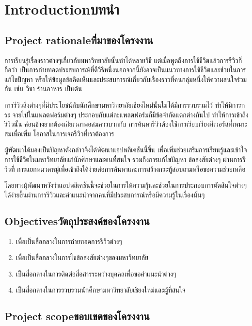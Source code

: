 \chapter{\ifenglish Introduction\else บทนำ\fi}

\section{\ifenglish Project rationale\else ที่มาของโครงงาน\fi}

การเรียนรู้เรื่องราวต่างๆเกี่ยวกับมหาวิทยาลัยนั้นทําได้หลายวิธี แต่เมื่อพูดถึงการใช้ชีวิตแล้วการรีวิวก็ถือว่า
เป็นการถ่ายทอดประสบการณ์ที่ดีวิธีหนึ่งนอกจากนี้ยังอาจเป็นแนวทางการใช้ชีวิตและช่วยในการแก้ไขปัญหา
หรือให้ข้อมูลข้อคิดเห็นและประสบการณ์เกี่ยวกับเรื่องราวที่คนกลุ่มหนึ่งให้ความสนใจร่วมกัน เช่น วิชา ร้านอาหาร เป็นต้น

การรีวิวสิ่งต่างๆที่มีประโยชน์กับนักศึกษามหาวิทยาลัยเชียงใหม่นั้นไม่ได้มีการรวบรวมไว้ ทําให้มีการกระ
จายไปในแพลตฟอร์มต่างๆ ประกอบกับแต่ละแพลตฟอร์มก็มีข้อจํากัดแตกต่างกันไป ทําให้การเข้าถึงรีวิวนั้น
ค่อนข้างยากต้องเสียเวลาพอสมควรบวกกับ การค้นหารีวิวต้องใช้การเรียบเรียงคีเวอร์สที่เหมาะสมเพื่อเพิ่ม
โอกาสในการเจอรีวิวที่เราต้องการ


ผู้พัฒนาได้มองเป็นปัญหาดังกล่าวจึงได้พัฒนาแอปพลิเคชันนี้ขึ้น เพื่อเพิ่มช่วยเสริมการเรียนรู้และเข้าใจ
การใช้ชีวิตในมหาวิทยาลัยแก่นักศึกษาและคนที่สนใจ รวมถึงการแก้ไขปัญหา ข้อสงสัยต่างๆ ผ่านการรีวิวที่ี
การแยกหมวดหมู่เพื่อเข้าถึงได้ง่ายต่อการค้นหาและการสร้างกระทู้สอบถามหรือขอความช่วยเหลือ

โดยทางผู้พัฒนาหวังว่าแอปพลิเคชันนี้จะช่วยในการให้ความรู้และช่วยในการประกอบการตัดสินใจต่างๆ
ได้ง่ายขึ้นผ่านการรีวิวและคําแนะนําจากคนที่มีประสบการณ์หรือมีความรู้ในเรื่องนั้นๆ

\section{\ifenglish Objectives\else วัตถุประสงค์ของโครงงาน\fi}
\begin{enumerate}
    \item เพื่อเป็นสื่อกลางในการถ่ายทอดการรีวิวต่างๆ
    \item เพื่อเป็นสื่อกลางในการไขข้อสงสัยต่างๆของมหาวิทยาลัย
    \item เป็นสื่อกลางในการติดต่อสื่อสารระหว่างบุคคลเพื่อขอคําแนะนําต่างๆ 
    \item เป็นสื่อกลางในการรวบรวมนักศึกษามหาวิทยาลัยเชียงใหม่และผู้ที่สนใจ
\end{enumerate}

\section{\ifenglish Project scope\else ขอบเขตของโครงงาน\fi}


